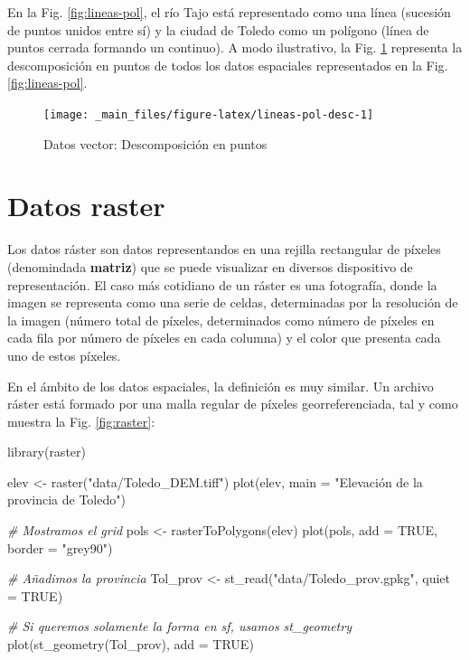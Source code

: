 \documentclass[
]{report}
\newenvironment{Shaded}{\begin{snugshade}}{\end{snugshade}}
\newcommand{\AttributeTok}[1]{\textcolor[rgb]{0.77,0.63,0.00}{#1}}
\newcommand{\CommentTok}[1]{\textcolor[rgb]{0.56,0.35,0.01}{\textit{#1}}}
\newcommand{\ConstantTok}[1]{\textcolor[rgb]{0.00,0.00,0.00}{#1}}
\newcommand{\FunctionTok}[1]{\textcolor[rgb]{0.00,0.00,0.00}{#1}}
\newcommand{\NormalTok}[1]{#1}
\newcommand{\OtherTok}[1]{\textcolor[rgb]{0.56,0.35,0.01}{#1}}
\newcommand{\StringTok}[1]{\textcolor[rgb]{0.31,0.60,0.02}{#1}}
\begin{document}
En la Fig. \ref{fig:lineas-pol}, el río Tajo está representado como una línea
(sucesión de puntos unidos entre sí) y la ciudad de Toledo como un polígono
(línea de puntos cerrada formando un continuo). A modo ilustrativo, la Fig.
\ref{fig:lineas-pol-desc} representa la descomposición en puntos de todos los
datos espaciales representados en la Fig. \ref{fig:lineas-pol}.

\begin{figure}

{\centering \texttt{[image: \_main\_files/figure-latex/lineas-pol-desc-1]} 

}

\caption{Datos vector: Descomposición en puntos}\label{fig:lineas-pol-desc}
\end{figure}

\hypertarget{datos-raster}{%
\section{Datos raster}\label{datos-raster}}

Los datos ráster son datos representandos en una rejilla rectangular de píxeles
(denomindada \textbf{matriz}) que se puede visualizar en diversos dispositivo de
representación. El caso más cotidiano de un ráster es una fotografía, donde la
imagen se representa como una serie de celdas, determinadas por la resolución de
la imagen (número total de píxeles, determinados como número de píxeles en cada
fila por número de píxeles en cada columna) y el color que presenta cada uno de
estos píxeles.

En el ámbito de los datos espaciales, la definición es muy similar. Un archivo
ráster está formado por una malla regular de píxeles georreferenciada, tal y
como muestra la Fig. \ref{fig:raster}:

\begin{Shaded}
\begin{Highlighting}[]

\FunctionTok{library}\NormalTok{(raster)}

\NormalTok{elev }\OtherTok{\textless{}{-}} \FunctionTok{raster}\NormalTok{(}\StringTok{"data/Toledo\_DEM.tiff"}\NormalTok{)}
\FunctionTok{plot}\NormalTok{(elev, }\AttributeTok{main =} \StringTok{"Elevación de la provincia de Toledo"}\NormalTok{)}

\CommentTok{\# Mostramos el grid}
\NormalTok{pols }\OtherTok{\textless{}{-}} \FunctionTok{rasterToPolygons}\NormalTok{(elev)}
\FunctionTok{plot}\NormalTok{(pols, }\AttributeTok{add =} \ConstantTok{TRUE}\NormalTok{, }\AttributeTok{border =} \StringTok{"grey90"}\NormalTok{)}

\CommentTok{\# Añadimos la provincia}
\NormalTok{Tol\_prov }\OtherTok{\textless{}{-}} \FunctionTok{st\_read}\NormalTok{(}\StringTok{"data/Toledo\_prov.gpkg"}\NormalTok{, }\AttributeTok{quiet =} \ConstantTok{TRUE}\NormalTok{)}

\CommentTok{\# Si queremos solamente la forma en sf, usamos st\_geometry}
\FunctionTok{plot}\NormalTok{(}\FunctionTok{st\_geometry}\NormalTok{(Tol\_prov), }\AttributeTok{add =} \ConstantTok{TRUE}\NormalTok{)}
\end{Highlighting}
\end{Shaded}
\end{document}

